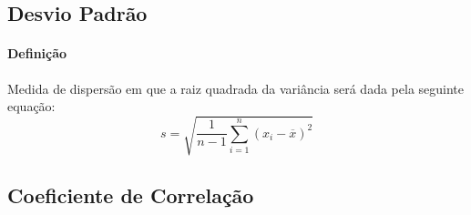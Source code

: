 \documentclass{article}
\begin{document}
        \subsection{Desvio Padrão}
            \paragraph{Definição}Medida de dispersão em que a raiz quadrada da variância será dada pela seguinte equação:
            \begin{equation}
                \boxed{
                    s = \sqrt{\frac{1}{n-1} \sum_{i=1}^{n} (x_{i} - \overline{x})^{2}}
                }
            \end{equation}

        \subsection{Coeficiente de Correlação}
\end{document}
